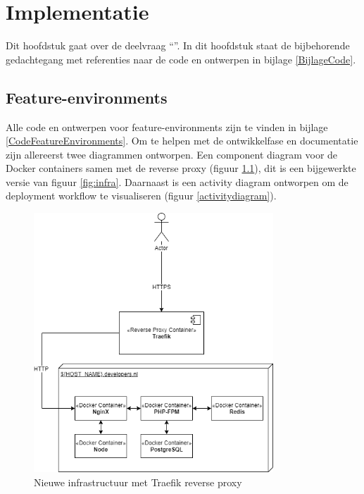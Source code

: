 \chapter{Implementatie}

\label{Chapter6}

Dit hoofdstuk gaat over de deelvraag \enquote{\deelimplementatie}. In dit hoofdstuk staat de bijbehorende gedachtegang met referenties naar de code en ontwerpen in bijlage \ref{BijlageCode}.

\section{Feature-environments} \label{implementatieFeatureEnvs}

Alle code en ontwerpen voor feature-environments zijn te vinden in bijlage \ref{CodeFeatureEnvironments}. Om te helpen met de ontwikkelfase en documentatie zijn allereerst twee diagrammen ontworpen. Een component diagram voor de Docker containers samen met de reverse proxy (figuur \ref{traefikinfrastructure}), dit is een bijgewerkte versie van figuur \ref{fig:infra}. Daarnaast is een activity diagram ontworpen om de deployment workflow te visualiseren (figuur \ref{activitydiagram}).

\begin{figure}[H]
	\centering
	\includegraphics[width=9cm]{Figures/Traefik}
	\decoRule
	\caption[Traefik Infrastructuur]{Nieuwe infrastructuur met Traefik reverse proxy}
	\label{traefikinfrastructure}
\end{figure}

